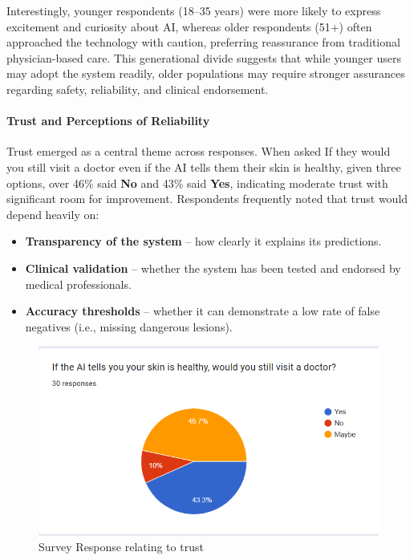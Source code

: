 \documentclass[
  12pt,
  oneside]{article}
\providecommand{\tightlist}{%
  \setlength{\itemsep}{0pt}\setlength{\parskip}{0pt}}
\begin{document}
Interestingly, younger respondents (18--35 years) were more likely to
express excitement and curiosity about AI, whereas older respondents
(51+) often approached the technology with caution, preferring
reassurance from traditional physician-based care. This generational
divide suggests that while younger users may adopt the system readily,
older populations may require stronger assurances regarding safety,
reliability, and clinical endorsement.

\paragraph{Trust and Perceptions of
Reliability}\label{trust-and-perceptions-of-reliability}

Trust emerged as a central theme across responses. When asked If they
would you still visit a doctor even if the AI tells them their skin is
healthy, given three options, over 46\% said \textbf{No} and 43\% said
\textbf{Yes}, indicating moderate trust with significant room for
improvement. Respondents frequently noted that trust would depend
heavily on:

\begin{itemize}
\tightlist
\item
  \textbf{Transparency of the system} -- how clearly it explains its
  predictions.\\
\item
  \textbf{Clinical validation} -- whether the system has been tested and
  endorsed by medical professionals.\\
\item
  \textbf{Accuracy thresholds} -- whether it can demonstrate a low rate
  of false negatives (i.e., missing dangerous lesions).
\end{itemize}

\begin{figure}

{\centering \includegraphics[width=1\linewidth]{trust} 

}

\caption{Survey Response relating to trust}\label{fig:unnamed-chunk-7}
\end{figure}
\end{document}
